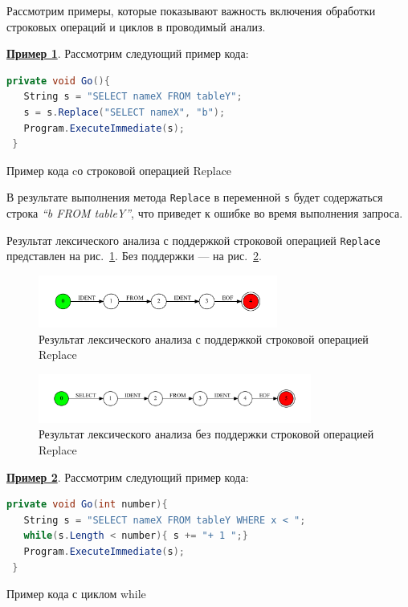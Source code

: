 Рассмотрим примеры, которые показывают важность включения обработки строковых операций и циклов в проводимый анализ.  

\textbf{\underline{Пример 1}}. 
Рассмотрим следующий пример кода:
\begin{listing}[H]
    \begin{lstlisting}[language=csharp]
 private void Go(){
   String s = "SELECT nameX FROM tableY";
   s = s.Replace("SELECT nameX", "b");
   Program.ExecuteImmediate(s);
 }
    \end{lstlisting}
\caption{Пример кода cо строковой операцией Replace}
\label{lst:exampleR}
\end{listing}

В результате выполнения метода \verb|Replace| в переменной \verb|s| будет содержаться строка \textit{``b FROM tableY''}, что приведет к ошибке во время выполнения запроса. 

Результат лексического анализа с поддержкой строковой операцией \verb|Replace| представлен на рис.~\ref{fig:replace_ex_1}. Без поддержки --- на рис.~\ref{fig:replace_ex}.  

\begin{figure}[h!]
\begin{center}
\includegraphics[width=0.7\textwidth]{Polubelova/ReplaceEx}
\caption{Результат лексического анализа с поддержкой строковой операцией Replace}
\label{fig:replace_ex_1} 
\end{center}
\end{figure}

\begin{figure}[h!]
\begin{center}
\includegraphics[width=0.8\textwidth]{Polubelova/ReplaceEx1}
\caption{Результат лексического анализа без поддержки строковой операцией Replace}
\label{fig:replace_ex} 
\end{center}
\end{figure}

\textbf{\underline{Пример 2}}. 
Рассмотрим следующий пример кода:
\begin{listing}[H]
    \begin{lstlisting}[language=csharp]
 private void Go(int number){
   String s = "SELECT nameX FROM tableY WHERE x < ";
   while(s.Length < number){ s += "+ 1 ";}
   Program.ExecuteImmediate(s);
 }
    \end{lstlisting}
\caption{Пример кода с циклом while}
\label{lst:exampleW}
\end{listing}

